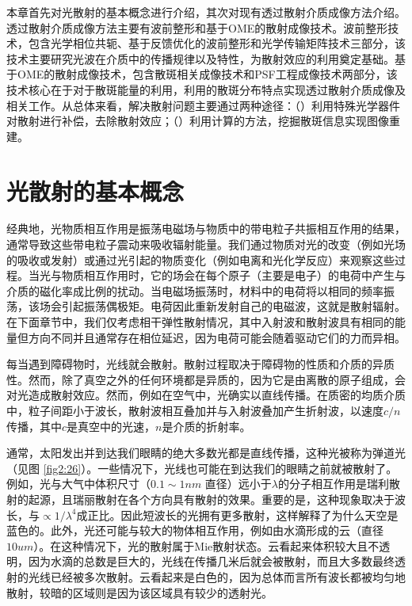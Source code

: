 本章首先对光散射的基本概念进行介绍，其次对现有透过散射介质成像方法介绍\cite{ZhuLei2020}。
透过散射介质成像方法主要有波前整形和基于OME的散射成像技术。波前整形技术，包含光学相位共轭、基于反馈优化的波前整形和光学传输矩阵技术三部分，该技术主要研究光波在介质中的传播规律以及特性，为散射效应的利用奠定基础。基于OME的散射成像技术，包含散斑相关成像技术和PSF工程成像技术两部分，该技术核心在于对于散斑能量的利用，利用的散斑分布特点实现透过散射介质成像及相关工作。从总体来看，解决散射问题主要通过两种途径：（）利用特殊光学器件对散射进行补偿，去除散射效应；（）利用计算的方法，挖掘散斑信息实现图像重建。

\section{光散射的基本概念}

经典地，光物质相互作用是振荡电磁场与物质中的带电粒子共振相互作用的结果，通常导致这些带电粒子震动来吸收辐射能量。我们通过物质对光的改变（例如光场的吸收或发射）或通过光引起的物质变化（例如电离和光化学反应）来观察这些过程。当光与物质相互作用时，它的场会在每个原子（主要是电子）的电荷中产生与介质的磁化率成比例的扰动。当电磁场振荡时，材料中的电荷将以相同的频率振荡，该场会引起振荡偶极矩。电荷因此重新发射自己的电磁波，这就是散射辐射。在下面章节中，我们仅考虑相干弹性散射情况，其中入射波和散射波具有相同的能量但方向不同并且通常存在相位延迟，因为电荷可能会随着驱动它们的力而异相。

每当遇到障碍物时，光线就会散射。散射过程取决于障碍物的性质和介质的异质性。然而，除了真空之外的任何环境都是异质的，因为它是由离散的原子组成，会对光造成散射效应。然而，例如在空气中，光确实以直线传播。在质密的均质介质中，粒子间距小于波长，散射波相互叠加并与入射波叠加产生折射波，以速度$c/n$传播，其中$c$是真空中的光速，$n$是介质的折射率\cite{bohren_absorption_2008}。

通常，太阳发出并到达我们眼睛的绝大多数光都是直线传播，这种光被称为弹道光（见图 \ref{fig2:26}）。一些情况下，光线也可能在到达我们的眼睛之前就被散射了。例如，光与大气中体积尺寸（$0.1 \sim 1 nm$ 直径）远小于$\lambda$的分子相互作用是瑞利散射的起源，且瑞丽散射在各个方向具有散射的效果。重要的是，这种现象取决于波长，与$\propto 1/ \lambda^4$成正比。因此短波长的光拥有更多散射，这样解释了为什么天空是蓝色的。此外，光还可能与较大的物体相互作用，例如由水滴形成的云（直径$10 um$）。在这种情况下，光的散射属于Mie散射状态\cite{noauthor_mie_2022}。云看起来体积较大且不透明，因为水滴的总数是巨大的，光线在传播几米后就会被散射，而且大多数最终透射的光线已经被多次散射。云看起来是白色的，因为总体而言所有波长都被均匀地散射，较暗的区域则是因为该区域具有较少的透射光。

